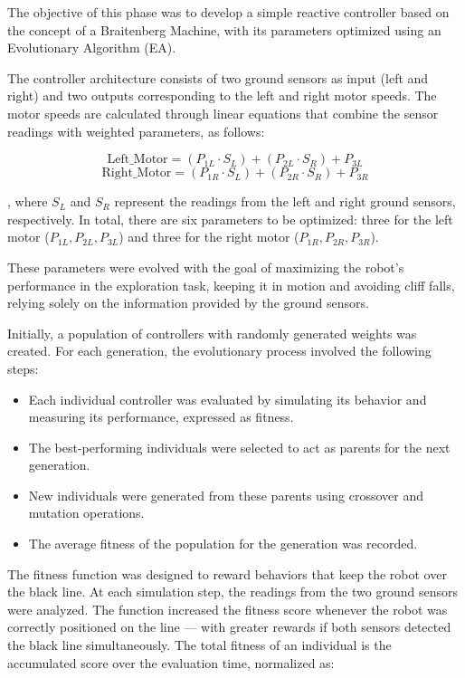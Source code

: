 \documentclass[final,5p,times,twocolumn,authoryear]{elsarticle}
\begin{document}
The objective of this phase was to develop a simple reactive controller based on the concept of a Braitenberg Machine, with its parameters optimized using an Evolutionary Algorithm (EA).

The controller architecture consists of two ground sensors as input (left and right) and two outputs corresponding to the left and right motor speeds. The motor speeds are calculated through linear equations that combine the sensor readings with weighted parameters, as follows:

\begin{equation}
    \text{Left\_Motor} = (P_{1L} \cdot S_L) + (P_{2L} \cdot S_R) + P_{3L}
\end{equation}    
\begin{equation}
    \text{Right\_Motor} = (P_{1R} \cdot S_L) + (P_{2R} \cdot S_R) + P_{3R}
\end{equation} 

, where \(S_L\) and \(S_R\) represent the readings from the left and right ground sensors, respectively. In total, there are six parameters to be optimized: three for the left motor (\(P_{1L}, P_{2L}, P_{3L}\)) and three for the right motor (\(P_{1R}, P_{2R}, P_{3R}\)).

These parameters were evolved with the goal of maximizing the robot's performance in the exploration task, keeping it in motion and avoiding cliff falls, relying solely on the information provided by the ground sensors.

Initially, a population of controllers with randomly generated weights was created. For each generation, the evolutionary process involved the following steps:

\begin{itemize}
    \item Each individual controller was evaluated by simulating its behavior and measuring its performance, expressed as fitness.
    \item The best-performing individuals were selected to act as parents for the next generation.
    \item New individuals were generated from these parents using crossover and mutation operations.
    \item The average fitness of the population for the generation was recorded.
\end{itemize}

The fitness function was designed to reward behaviors that keep the robot over the black line. At each simulation step, the readings from the two ground sensors were analyzed. The function increased the fitness score whenever the robot was correctly positioned on the line — with greater rewards if both sensors detected the black line simultaneously. The total fitness of an individual is the accumulated score over the evaluation time, normalized as:
\end{document}
